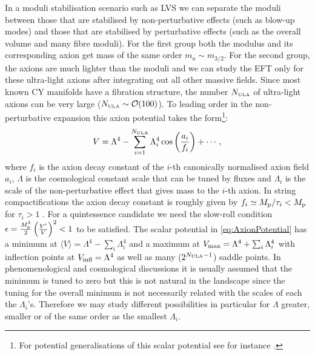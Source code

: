 \documentclass[11pt,a4paper]{article}
\newcommand{\be}{\begin{equation}}
\newcommand{\ee}{\end{equation}}
\def\ULA{{\scriptscriptstyle \rm ULA}}
\newcommand{\mc}{\mathcal}
\begin{document}
\begin{itemize}
In a moduli stabilisation scenario such as LVS we can separate the moduli between those that are stabilised by non-perturbative effects (such as blow-up modes) and those that are stabilised by perturbative effects (such as the overall volume and many fibre moduli). For the first group both the modulus and its corresponding axion get mass of the same order $m_a\sim m_{3/2}$. For the second group, the axions are much lighter than the moduli and we can study the EFT only for these ultra-light axions after integrating out all other massive fields. Since most known CY manifolds have a fibration structure, the number $N_\ULA$ of ultra-light axions can be very large ($N_\ULA\sim\mc{O}(100)$). To leading order in the non-perturbative expansion this axion potential takes the form\footnote{For potential generalisations of this scalar potential see for instance \cite{Bachlechner:2017zpb}.}:
\be
V=\Lambda^4-\sum_{i=1}^{N_\ULA} \Lambda_i^4 \cos\left(\frac{a_i}{f_i}\right) + \cdots \,,
\label{eq:AxionPotential}
\ee
where $f_i$ is the axion decay constant of the $i$-th canonically normalised axion field $a_i$, $\Lambda$ is the cosmological constant scale that can be tuned by fluxes and $\Lambda_i$ is the scale of the non-perturbative effect that gives mass to the $i$-th axion. In string compactifications the axion decay constant is roughly given by $f_i \simeq M_{\rm p}/ \tau_i < M_{\rm p}$ for $\tau_i >1$ \cite{Svrcek:2006yi, Arvanitaki:2009fg, Cicoli:2012sz}. For a quintessence candidate we need the slow-roll condition $\epsilon=\frac{M_{\rm p}^2}{2} \left(\frac{V'}{V}\right )^2 < 1$ to be satisfied. The scalar potential in \eqref{eq:AxionPotential} has a minimum at $\langle V\rangle = \Lambda^4-\sum_i\Lambda_i^4$ and a maximum at $V_{\rm max}=\Lambda^4+\sum_i\Lambda_i^4$ with  inflection points at $V_{\rm infl}=\Lambda^4$ as well as many ($2^{N_\ULA-1}$) saddle points. In phenomenological and cosmological discussions it is usually assumed that the minimum is tuned to zero but this is not natural in the landscape since the tuning for the overall minimum is not necessarily related with the scales of each the $\Lambda_i$'s. Therefore we may study different possibilities in particular for $\Lambda$ greater, smaller or of the same order as the smallest $\Lambda_i$.


\end{itemize}
\end{document}
